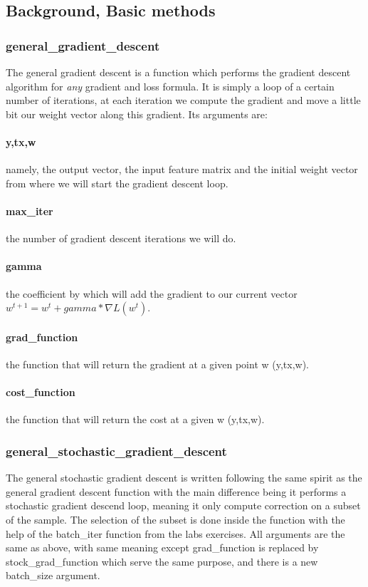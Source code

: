 \documentclass[10pt,conference,compsocconf]{IEEEtran}
\begin{document}
\subsection{Background, Basic methods}
\subsubsection{general\_gradient\_descent}
The general gradient descent is a function which performs the gradient descent algorithm for \emph{any} gradient and loss formula. It is simply a loop of a certain number of iterations, at each iteration we compute the gradient and move a little bit our weight vector along this gradient. Its arguments are:
\paragraph{y,tx,w} namely, the output vector, the input feature matrix and the initial weight vector from where we will start the gradient descent loop.
\paragraph{max\_iter} the number of gradient descent iterations we will do.
\paragraph{gamma} the coefficient by which will add the gradient to our current vector \(w^{t+1}=w^{t}+gamma*\nabla L(w^{t})\).
\paragraph{grad\_function} the function that will return the gradient at a given point w (y,tx,w).
\paragraph{cost\_function} the function that will return the cost at a given w (y,tx,w).


\subsubsection{general\_stochastic\_gradient\_descent}
The general stochastic gradient descent is written following the same spirit as the general gradient descent function with the main difference being it performs a stochastic gradient descend loop, meaning it only compute correction on a subset of the sample. The selection of the subset is done inside the function with the help of the batch\_iter function from the labs exercises. All arguments are the same as above, with same meaning except grad\_function is replaced by stock\_grad\_function which serve the same purpose, and there is a new batch\_size argument.
\end{document}
